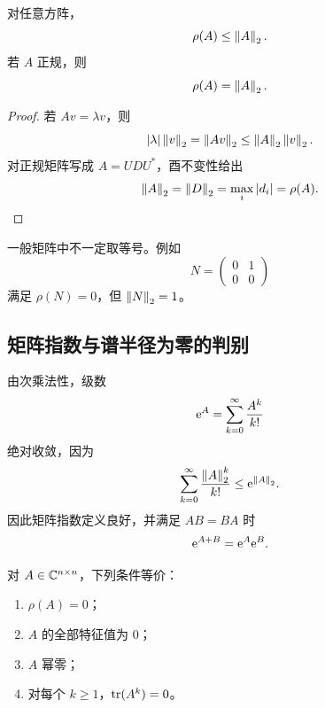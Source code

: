 \begin{theorem}
对任意方阵，
\begin{equation}
 \rho(A)\leq\left\lVert A\right\rVert_2.
\end{equation}
若 $A$ 正规，则
\begin{equation}
 \rho(A)=\left\lVert A\right\rVert_2.
\end{equation}
\end{theorem}

\begin{proof}
若 $Av=\lambda v$，则
\begin{equation}
 |\lambda|\left\lVert v\right\rVert_2=\left\lVert Av\right\rVert_2\leq\left\lVert A\right\rVert_2\left\lVert v\right\rVert_2.
\end{equation}
对正规矩阵写成 $A=UDU^*$，酉不变性给出
\begin{equation}
 \left\lVert A\right\rVert_2=\left\lVert D\right\rVert_2=\max_i|d_i|=\rho(A).
\end{equation}
\end{proof}

\begin{remark}
一般矩阵中不一定取等号。例如
\begin{equation}
 N=\begin{pmatrix}0&1\\0&0\end{pmatrix}
\end{equation}
满足 $\rho(N)=0$，但 $\left\lVert N\right\rVert_2=1$。
\end{remark}

\subsection{矩阵指数与谱半径为零的判别}

由次乘法性，级数
\begin{equation}
 \mathrm e^A=\sum_{k=0}^{\infty}\frac{A^k}{k!}
\end{equation}
绝对收敛，因为
\begin{equation}
 \sum_{k=0}^{\infty}\frac{\left\lVert A\right\rVert_2^k}{k!}
 \leq\mathrm e^{\left\lVert A\right\rVert_2}.
\end{equation}
因此矩阵指数定义良好，并满足 $AB=BA$ 时
\begin{equation}
 \mathrm e^{A+B}=\mathrm e^A\mathrm e^B.
\end{equation}

\begin{theorem}
对 $A\in\mathbb C^{n\times n}$，下列条件等价：
\begin{enumerate}
  \item $\rho(A)=0$；
  \item $A$ 的全部特征值为 $0$；
  \item $A$ 幂零；
  \item 对每个 $k\geq1$，$\operatorname{tr}(A^k)=0$。
\end{enumerate}
\end{theorem}


